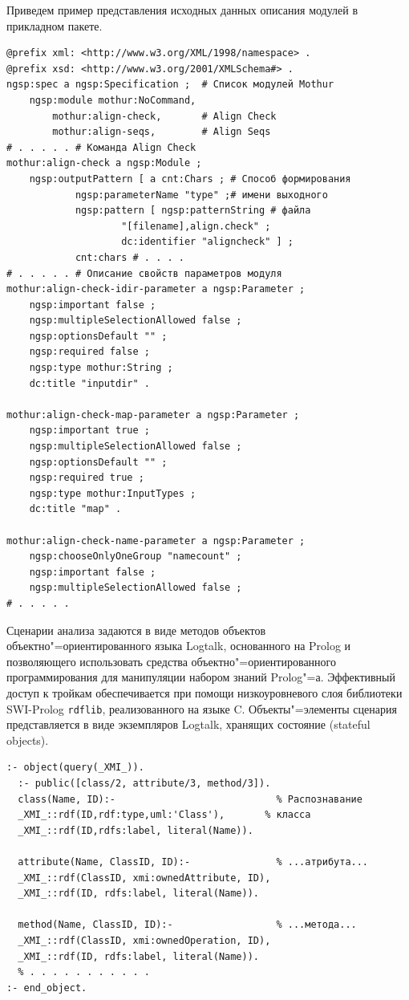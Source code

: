 \documentclass[12pt]{article}
\begin{document}
Приведем пример представления исходных данных описания модулей в прикладном пакете.
\begin{verbatim}
@prefix xml: <http://www.w3.org/XML/1998/namespace> .
@prefix xsd: <http://www.w3.org/2001/XMLSchema#> .
ngsp:spec a ngsp:Specification ;  # Список модулей Mothur
    ngsp:module mothur:NoCommand,
        mothur:align-check,       # Align Check
        mothur:align-seqs,        # Align Seqs
# . . . . . # Команда Align Check
mothur:align-check a ngsp:Module ;
    ngsp:outputPattern [ a cnt:Chars ; # Способ формирования
            ngsp:parameterName "type" ;# имени выходного
            ngsp:pattern [ ngsp:patternString # файла
                    "[filename],align.check" ;
                    dc:identifier "aligncheck" ] ;
            cnt:chars # . . . .
# . . . . . # Описание свойств параметров модуля
mothur:align-check-idir-parameter a ngsp:Parameter ;
    ngsp:important false ;
    ngsp:multipleSelectionAllowed false ;
    ngsp:optionsDefault "" ;
    ngsp:required false ;
    ngsp:type mothur:String ;
    dc:title "inputdir" .

mothur:align-check-map-parameter a ngsp:Parameter ;
    ngsp:important true ;
    ngsp:multipleSelectionAllowed false ;
    ngsp:optionsDefault "" ;
    ngsp:required true ;
    ngsp:type mothur:InputTypes ;
    dc:title "map" .

mothur:align-check-name-parameter a ngsp:Parameter ;
    ngsp:chooseOnlyOneGroup "namecount" ;
    ngsp:important false ;
    ngsp:multipleSelectionAllowed false ;
# . . . . .
\end{verbatim}

Сценарии анализа задаются в виде методов объектов объектно"=ориентированного языка Logtalk, основанного на Prolog и позволяющего использовать средства объектно"=ориентированного программирования для манипуляции набором знаний Prolog"=а. Эффективный доступ к тройкам обеспечивается при помощи низкоуровневого слоя библиотеки SWI-Prolog \texttt{rdflib}, реализованного на языке C.  Объекты"=элементы сценария представляется в виде экземпляров Logtalk, хранящих состояние (stateful objects).

\begin{verbatim}
:- object(query(_XMI_)).
  :- public([class/2, attribute/3, method/3]).
  class(Name, ID):-                            % Распознавание
  _XMI_::rdf(ID,rdf:type,uml:'Class'),       % класса
  _XMI_::rdf(ID,rdfs:label, literal(Name)).

  attribute(Name, ClassID, ID):-               % ...атрибута...
  _XMI_::rdf(ClassID, xmi:ownedAttribute, ID),
  _XMI_::rdf(ID, rdfs:label, literal(Name)).

  method(Name, ClassID, ID):-                  % ...метода...
  _XMI_::rdf(ClassID, xmi:ownedOperation, ID),
  _XMI_::rdf(ID, rdfs:label, literal(Name)).
  % . . . . . . . . . . .
:- end_object.
\end{verbatim}
\end{document}
